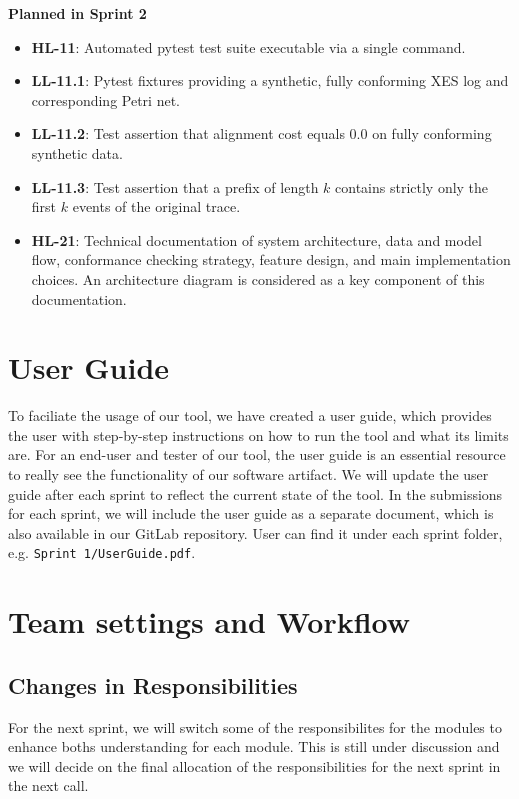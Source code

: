 \documentclass[12pt,a4paper]{article}
\begin{document}
\noindent \textbf{Planned in Sprint 2}
\begin{itemize}
    \item \textbf{HL-11}: Automated pytest test suite executable via a single command.
    \item \textbf{LL-11.1}: Pytest fixtures providing a synthetic, fully conforming XES log and corresponding Petri net.
    \item \textbf{LL-11.2}: Test assertion that alignment cost equals $0.0$ on fully conforming synthetic data.
    \item \textbf{LL-11.3}: Test assertion that a prefix of length $k$ contains strictly only the first $k$ events of the original trace.
    \item \textbf{HL-21}: Technical documentation of system architecture, data and model flow, conformance checking strategy, feature design, and main implementation choices. An architecture diagram is considered as a key component of this documentation.
\end{itemize}

\section{User Guide}
To faciliate the usage of our tool, we have created a user guide, which provides the user with step-by-step instructions on how to run the tool and what its limits are. For an end-user and tester of our tool, the user guide is an essential resource to really see the functionality of our software artifact. We will update the user guide after each sprint to reflect the current state of the tool. In the submissions for each sprint, we will include the user guide as a separate document, which is also available in our GitLab repository. User can find it under each sprint folder, e.g. \texttt{Sprint 1/UserGuide.pdf}.

\section{Team settings and Workflow}
\subsection{Changes in Responsibilities}
For the next sprint, we will switch some of the responsibilites for the modules to enhance boths understanding for each module. This is still under discussion and we will decide on the final allocation of the responsibilities for the next sprint in the next call. 
\end{document}
